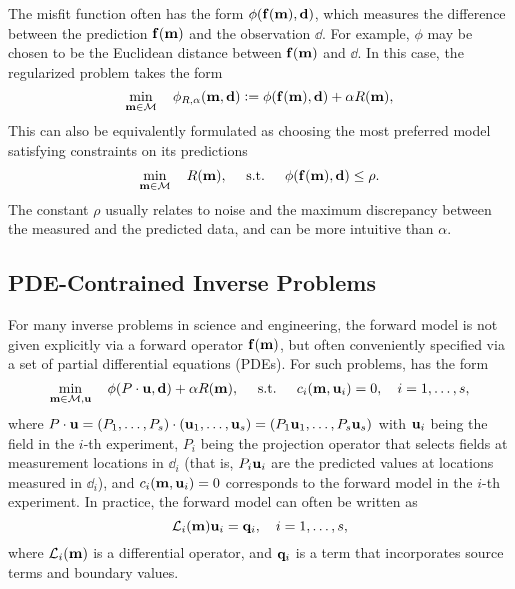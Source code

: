 The misfit function often has the form $\phi({\bf f}({\bf m}), {\bf d})$, which
measures the difference between the prediction ${\bf f}({\bf m})$ and the observation
$\dd$.
For example, $\phi$ may be chosen to be the Euclidean distance between
${\bf f}({\bf m})$ and $\dd$.
In this case, the regularized problem takes the form
\begin{equation} \label{eq:reg_invopt2}
	\min_{{\bf m} \in {\cal M}}\quad 
		\phi_{R,\alpha}({\bf m}, {\bf d}) 
			\mathrel{\mathop:}= \phi({\bf f}({\bf m}), {\bf d}) + \alpha R({\bf m}),
\end{equation}
This can also be equivalently formulated as choosing the most preferred model
satisfying constraints on its predictions
\begin{equation} \label{eq:reg_invopt3}
	\min_{{\bf m} \in {\cal M}}\quad R({\bf m}), \quad
	 \text{ s.t. }\quad \phi({\bf f}({\bf m}), {\bf d}) \le \rho.
\end{equation}
The constant $\rho$ usually relates to noise and the maximum discrepancy between
the measured and the predicted data, and can be more intuitive than $\alpha$.

\subsection{PDE-Contrained Inverse Problems}
\label{sec:application}
For many inverse problems in science and engineering, the forward model is not
given explicitly via a forward operator ${\bf f}({\bf m})$, but often conveniently
specified via a set of partial differential equations (PDEs).
For such problems,  has the form
\begin{equation} \label{eq:pde-invopt}
	\min_{{\bf m} \in {\cal M}, {\bf u}}\quad 
		\phi(P \cdot {\bf u}, {\bf d}) + \alpha R({\bf m}), \quad
			\text{ s.t. }\quad c_{i}({\bf m}, {\bf u}_{i}) = 0, \quad i=1, \ldots, s,
\end{equation}
where $P \cdot {\bf u} 
= (P_1, \ldots, P_s) \cdot ({\bf u}_1, \ldots, {\bf u}_s)
= (P_1 {\bf u}_1, \ldots, P_s {\bf u}_s)$ with ${\bf u}_{i}$ being the field in the $i$-th
experiment, $P_{i}$ being the projection operator that selects fields at
measurement locations in $\dd_{i}$ (that is, $P_{i} {\bf u}_{i}$ are the predicted values
at locations measured in $\dd_{i}$), and $c_{i}({\bf m}, {\bf u}_{i}) = 0$ corresponds to the
forward model in the $i$-th experiment.
In practice, the forward model can often be written as 
\begin{equation} \label{eq:lin-model} 
	{\cal L}_{i}({\bf m}) {\bf u}_{i} = {\bf q}_{i}, \quad i = 1, \ldots, s,
\end{equation}
where ${\cal L}_{i}({\bf m})$ is a differential operator, and ${\bf q}_{i}$ is a term that
incorporates source terms and boundary values.


